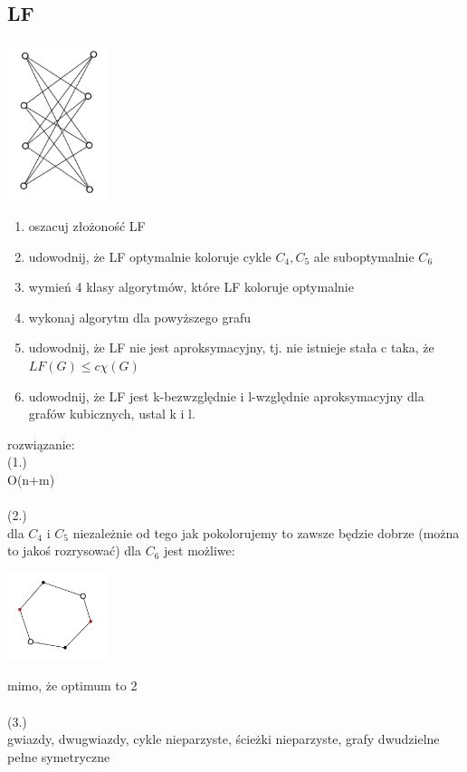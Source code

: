 \documentclass{article}
\begin{document}
\subsection*{LF}
 \begin{center}
\includegraphics[width=3cm]{lysy_z_tvgry}
\end{center}
\begin{enumerate}
	\item oszacuj złożoność LF
	\item udowodnij, że LF optymalnie koloruje cykle $C_4, C_5$ ale suboptymalnie $C_6$ 
	\item wymień 4 klasy algorytmów, które LF koloruje optymalnie
	\item wykonaj algorytm dla powyższego grafu
	\item udowodnij, że LF nie jest aproksymacyjny, tj. nie istnieje stała c taka, że $LF(G) \leq c\chi(G)$
	\item udowodnij, że LF jest k-bezwzględnie i l-względnie aproksymacyjny dla grafów kubicznych, ustal k i l.
\end{enumerate}
rozwiązanie: \\
(1.)\\
O(n+m) \\\\
(2.)\\
dla $C_4$ i $C_5$ niezależnie od tego jak pokolorujemy to zawsze będzie dobrze (można to jakoś rozrysować)
dla $C_6$ jest możliwe:
 \begin{center}
\includegraphics[width=3cm]{C6_zle}
\end{center}
mimo, że optimum to 2 \\\\
(3.) \\
gwiazdy, dwugwiazdy, cykle nieparzyste, ścieżki nieparzyste, grafy dwudzielne pełne symetryczne \\\\
\end{document}
